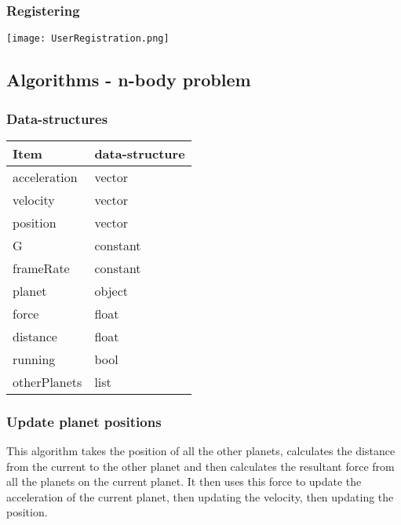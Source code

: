 \documentclass[12pt]{article}
\begin{document}
\newpage
\subsubsection{Registering}
\begin{center}
    \texttt{[image: UserRegistration.png]} 
\end{center}



\newpage
\subsection{Algorithms - n-body problem}

\subsubsection{Data-structures}

\begin{center}
\begin{tabularx}{0.8\textwidth} { 
  | >{\raggedright\arraybackslash}X 
  | >{\raggedleft\arraybackslash}X | }
 \hline
 \textbf{Item} & \textbf{data-structure} \\
 \hline
 acceleration  & vector  \\
\hline
velocity & vector \\
\hline
position & vector \\
\hline
G & constant \\
\hline
frameRate & constant \\
\hline
planet & object \\
\hline
force & float \\
\hline
distance & float \\
\hline
running & bool \\
\hline
otherPlanets & list \\
\hline

\end{tabularx}
\end{center}

\subsubsection{Update planet positions}

This algorithm takes the position of all the other planets, calculates the distance from the current to the other planet and then calculates the resultant force from all the planets on the current planet. It then uses this force to update the acceleration of the current planet, then updating the velocity, then updating the position.\\
\end{document}
